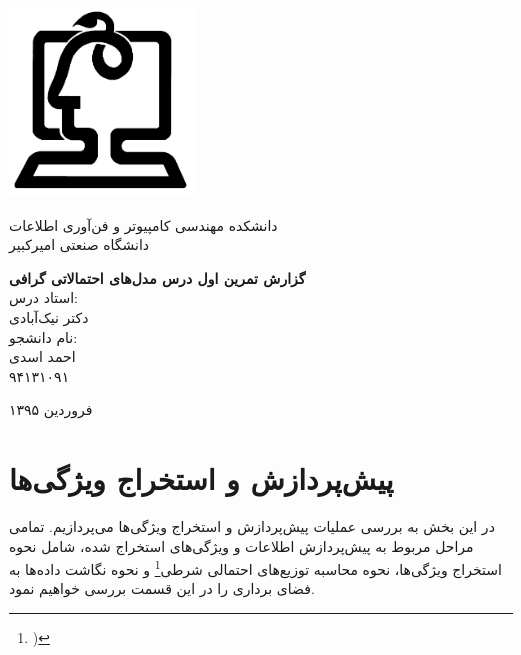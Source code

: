 \documentclass[11.5pt,a4paper]{article}
\newcommand{\nocontentsline}[3]{}
\newcommand{\tocless}[2]{\bgroup\let\addcontentsline=\nocontentsline#1{#2}\egroup}
\begin{document}
\thispagestyle{empty}
\vspace*{-28mm}
\centerline{\includegraphics[height=5cm]{Imgs/ceit_logo.png}}

\begin{center}
\vspace{-2mm}
{\LARGE
{
دانشکده مهندسی کامپیوتر و فن‌آوری اطلاعات\\	
دانشگاه صنعتی امیرکبیر	
}
\\[2.1cm]
}

{\large
\textbf{گزارش تمرین اول درس مدل‌های احتمالاتی گرافی}
\\[2cm]

استاد درس:
\\[.5cm]
{\Large
دکتر نیک‌آبادی}
\\[1.5cm]
\large 
نام دانشجو:
\\[.5cm]
{\Large
احمد اسدی}
\\[.5cm]
۹۴۱۳۱۰۹۱
\\[1.5cm]
}

{\large
فروردین ۱۳۹۵
}
\end{center}

\newpage
\baselineskip=1cm
\tocless\tableofcontents

\newpage
\baselineskip=0.75cm
\section{پیش‌پردازش و استخراج ویژگی‌ها}
در این بخش به بررسی عملیات پیش‌پردازش و استخراج ویژگی‌ها ‌می‌پردازیم. تمامی مراحل مربوط به پیش‌پردازش اطلاعات و ویژگی‌های استخراج شده، شامل نحوه استخراج ویژگی‌ها، نحوه محاسبه توزیع‌های احتمالی شرطی\footnote{)} و نحوه نگاشت داده‌ها به فضای برداری را در این قسمت بررسی خواهیم نمود.
\end{document}
